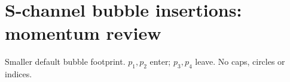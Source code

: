\documentclass[10pt,letterpaper]{article}
\begin{document}
\section*{S-channel bubble insertions: momentum review}
Smaller default bubble footprint. $p_1,p_2$ enter; $p_3,p_4$ leave. No caps, circles or indices.
\par\vspace{12pt}
\hfill
{}\par
{}\hfill
{}\par
\end{document}
